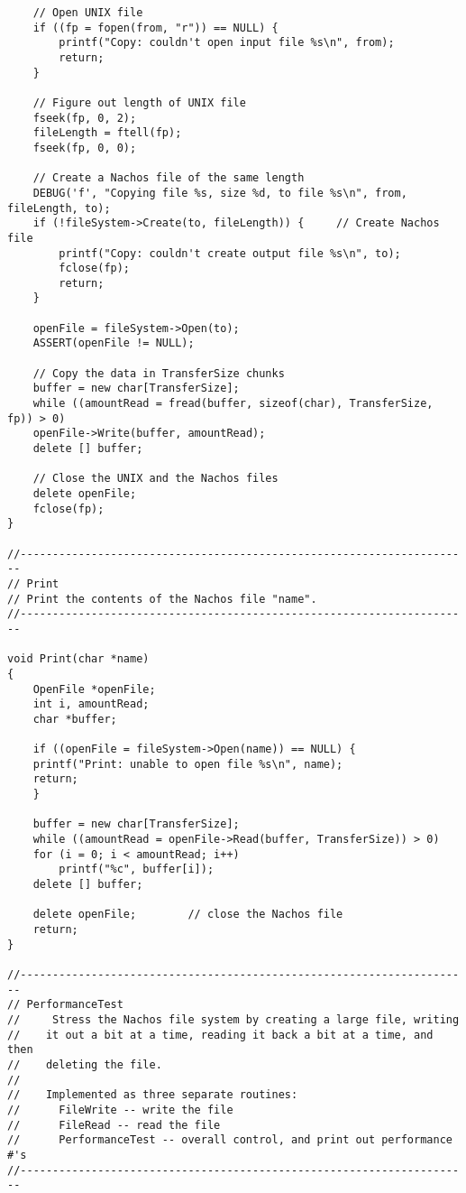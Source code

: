 \documentclass[a4paper,10pt]{article}
\begin{document}
\begin{lstlisting}
    // Open UNIX file
    if ((fp = fopen(from, "r")) == NULL) {
        printf("Copy: couldn't open input file %s\n", from);
        return;
    }

    // Figure out length of UNIX file
    fseek(fp, 0, 2);
    fileLength = ftell(fp);
    fseek(fp, 0, 0);

    // Create a Nachos file of the same length
    DEBUG('f', "Copying file %s, size %d, to file %s\n", from, fileLength, to);
    if (!fileSystem->Create(to, fileLength)) {     // Create Nachos file
        printf("Copy: couldn't create output file %s\n", to);
        fclose(fp);
        return;
    }

    openFile = fileSystem->Open(to);
    ASSERT(openFile != NULL);

    // Copy the data in TransferSize chunks
    buffer = new char[TransferSize];
    while ((amountRead = fread(buffer, sizeof(char), TransferSize, fp)) > 0)
    openFile->Write(buffer, amountRead);
    delete [] buffer;

    // Close the UNIX and the Nachos files
    delete openFile;
    fclose(fp);
}

//----------------------------------------------------------------------
// Print
// Print the contents of the Nachos file "name".
//----------------------------------------------------------------------

void Print(char *name)
{
    OpenFile *openFile;
    int i, amountRead;
    char *buffer;

    if ((openFile = fileSystem->Open(name)) == NULL) {
    printf("Print: unable to open file %s\n", name);
    return;
    }

    buffer = new char[TransferSize];
    while ((amountRead = openFile->Read(buffer, TransferSize)) > 0)
    for (i = 0; i < amountRead; i++)
        printf("%c", buffer[i]);
    delete [] buffer;

    delete openFile;        // close the Nachos file
    return;
}

//----------------------------------------------------------------------
// PerformanceTest
//     Stress the Nachos file system by creating a large file, writing
//    it out a bit at a time, reading it back a bit at a time, and then
//    deleting the file.
//
//    Implemented as three separate routines:
//      FileWrite -- write the file
//      FileRead -- read the file
//      PerformanceTest -- overall control, and print out performance #'s
//----------------------------------------------------------------------


\end{lstlisting}
\end{document}
